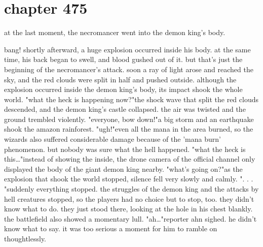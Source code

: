 \section{chapter 475}

at the last moment, the necromancer went into the demon king's body.





bang! shortly afterward, a huge explosion occurred inside his body.
 at the same time, his back began to swell, and blood gushed out of it.
 but that's just the beginning of the necromancer's attack.
 soon a ray of light arose and reached the sky, and the red clouds were split in half and pushed outside.
 although the explosion occurred inside the demon king's body, its impact shook the whole world.
"what the heck is happening now?"the shock wave that split the red clouds descended, and the demon king's castle collapsed.
 the air was twisted and the ground trembled violently.
 "everyone, bow down!"a big storm and an earthquake shook the amazon rainforest.
"ugh!"even all the mana in the area burned, so the wizards also suffered considerable damage because of the 'mana burn' phenomenon.
but nobody was sure what the hell happened.
"what the heck is this…"instead of showing the inside, the drone camera of the official channel only displayed the body of the giant demon king nearby.
"what's going on?"as the explosion that shook the world stopped, silence fell very slowly and calmly.
".
.
.
"suddenly everything stopped.
the struggles of the demon king and the attacks by hell creatures stopped, so the players had no choice but to stop, too.
 they didn't know what to do.
 they just stood there, looking at the hole in his chest blankly.
the battlefield also showed a momentary lull.
 "ah…"reporter ahn sighed.
 he didn't know what to say.
it was too serious a moment for him to ramble on thoughtlessly.

